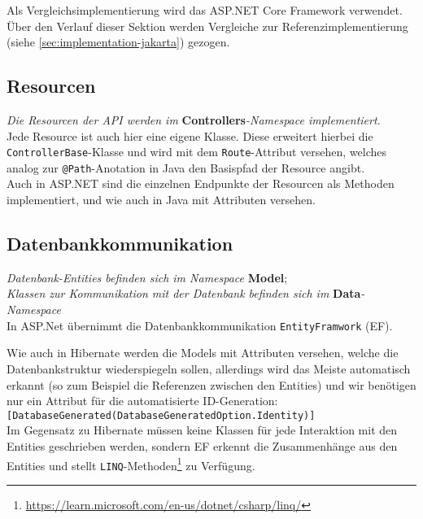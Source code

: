 Als Vergleichsimplementierung wird das ASP.NET Core Framework verwendet. 
\\
Über den Verlauf dieser Sektion werden Vergleiche zur Referenzimplementierung (siehe \ref{sec:implementation-jakarta}) gezogen.

\subsection{Resourcen}

\textit{Die Resourcen der API werden im} \textbf{Controllers}\textit{-Namespace implementiert.} \\

Jede Resource ist auch hier eine eigene Klasse. Diese erweitert hierbei die \texttt{ControllerBase}-Klasse und wird mit dem \texttt{Route}-Attribut versehen, welches analog zur \texttt{@Path}-Anotation in Java den Basispfad der Resource angibt.\\

Auch in ASP.NET sind die einzelnen Endpunkte der Resourcen als Methoden implementiert, und wie auch in Java mit Attributen versehen.

\subsection{Datenbankkommunikation}

\textit{Datenbank-Entities befinden sich im Namespace} \textbf{Model}; \\
\textit{Klassen zur Kommunikation mit der Datenbank befinden sich im} \textbf{Data}\textit{-Namespace} \\

In ASP.Net übernimmt die Datenbankkommunikation \texttt{EntityFramwork} (EF).

Wie auch in Hibernate werden die Models mit Attributen versehen, welche die Datenbankstruktur wiederspiegeln sollen, allerdings wird das Meiste automatisch erkannt (so zum Beispiel die Referenzen zwischen den Entities) und wir benötigen nur ein Attribut für die automatisierte ID-Generation: \texttt{[DatabaseGenerated(DatabaseGeneratedOption.Identity)]}\\

Im Gegensatz zu Hibernate müssen keine Klassen für jede Interaktion mit den Entities geschrieben werden, sondern EF erkennt die Zusammenhänge aus den Entities und stellt \texttt{LINQ}-Methoden\footnote{\url{https://learn.microsoft.com/en-us/dotnet/csharp/linq/}} zu Verfügung.


